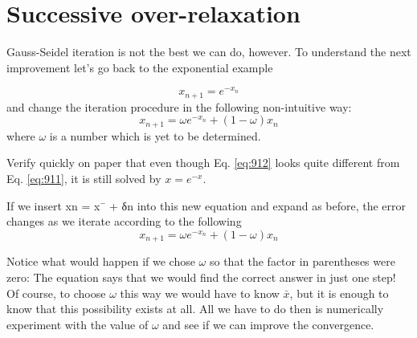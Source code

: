 \section*{Successive over-relaxation}
Gauss-Seidel iteration is not the best we can do, however. To understand the next
improvement let\rq s go back to the exponential example

\begin{equation}\label{eq:911}
x_{n+1}=e^{-x_{n}}
\end{equation}
and change the iteration procedure in the following non-intuitive way:
\begin{equation}\label{eq:912}
x_{n+1}=\omega e^{-x_{n}}+(1-\omega) x_{n}
\end{equation}
where $\omega$ is a number which is yet to be determined.
\begin{problem}\label{P9.3}Verify quickly on paper that even though Eq. \eqref{eq:912} looks quite different
from Eq. \eqref{eq:911}, it is still solved by $x = e^{-x}$.\end{problem}
If we insert xn = x¯ + δn into this new equation and expand as before, the error
changes as we iterate according to the following
\begin{equation}\label{eq:913}
x_{n+1}=\omega e^{-x_{n}}+(1-\omega) x_{n}
\end{equation}

Notice what would happen if we chose $\omega$ so that the factor in parentheses were
zero: The equation says that we would find the correct answer in just one step! Of
course, to choose $\omega$ this way we would have to know $\bar{x}$, but it is enough to know
that this possibility exists at all. All we have to do then is numerically experiment
with the value of $\omega$ and see if we can improve the convergence.


